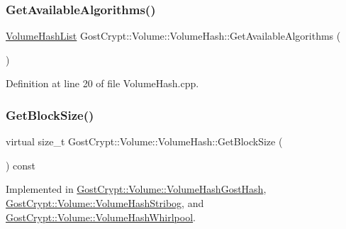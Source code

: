 \subsubsection{\texorpdfstring{Get\+Available\+Algorithms()}{GetAvailableAlgorithms()}}
{\footnotesize\ttfamily \hyperlink{namespace_gost_crypt_1_1_volume_a513257938e5ea0554ad83d0eb08f8f67}{Volume\+Hash\+List} Gost\+Crypt\+::\+Volume\+::\+Volume\+Hash\+::\+Get\+Available\+Algorithms (\begin{DoxyParamCaption}{ }\end{DoxyParamCaption})\hspace{0.3cm}{\ttfamily [static]}}



Definition at line 20 of file Volume\+Hash.\+cpp.

\mbox{\label{class_gost_crypt_1_1_volume_1_1_volume_hash_afa3e93a57c887289134901df48b9bced}} 
\subsubsection{\texorpdfstring{Get\+Block\+Size()}{GetBlockSize()}}
{\footnotesize\ttfamily virtual size\+\_\+t Gost\+Crypt\+::\+Volume\+::\+Volume\+Hash\+::\+Get\+Block\+Size (\begin{DoxyParamCaption}{ }\end{DoxyParamCaption}) const\hspace{0.3cm}{\ttfamily [pure virtual]}}



Implemented in \hyperlink{class_gost_crypt_1_1_volume_1_1_volume_hash_gost_hash_afbe58e3f3b31b065b85e5120ad1adff0}{Gost\+Crypt\+::\+Volume\+::\+Volume\+Hash\+Gost\+Hash}, \hyperlink{class_gost_crypt_1_1_volume_1_1_volume_hash_stribog_a27b7f587f66155c0edf88af3eb84686a}{Gost\+Crypt\+::\+Volume\+::\+Volume\+Hash\+Stribog}, and \hyperlink{class_gost_crypt_1_1_volume_1_1_volume_hash_whirlpool_af69656fa05403a8cd3245446c93a52d4}{Gost\+Crypt\+::\+Volume\+::\+Volume\+Hash\+Whirlpool}.

\mbox{\label{class_gost_crypt_1_1_volume_1_1_volume_hash_a8ae75f9cc4beea8ecb8751ecb221c797}} 

